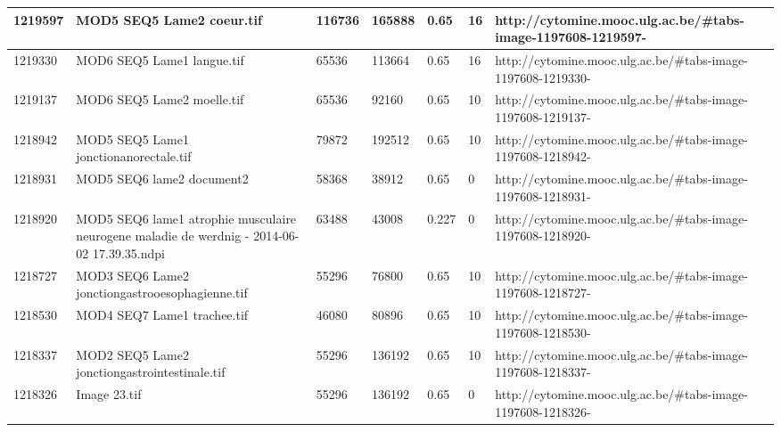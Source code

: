 \documentclass[a4paper,11pt]{report}
\numberwithin{figure}{section} %
\begin{document}
\begin{table}[]
{\begin{tabular}{|l|l|l|l|l|l|l|}
1219597  & MOD5 SEQ5 Lame2 coeur.tif                                                                    & 116736 & 165888 & 0.65                  & 16          & http://cytomine.mooc.ulg.ac.be/\#tabs-image-1197608-1219597-  \\ \hline
1219330  & MOD6 SEQ5 Lame1 langue.tif                                                                   & 65536  & 113664 & 0.65                  & 16          & http://cytomine.mooc.ulg.ac.be/\#tabs-image-1197608-1219330-  \\ \hline
1219137  & MOD6 SEQ5 Lame2 moelle.tif                                                                   & 65536  & 92160  & 0.65                  & 10          & http://cytomine.mooc.ulg.ac.be/\#tabs-image-1197608-1219137-  \\ \hline
1218942  & MOD5 SEQ5 Lame1 jonctionanorectale.tif                                                       & 79872  & 192512 & 0.65                  & 10          & http://cytomine.mooc.ulg.ac.be/\#tabs-image-1197608-1218942-  \\ \hline
1218931  & MOD5 SEQ6 lame2 document2                                                                    & 58368  & 38912  & 0.65                  & 0           & http://cytomine.mooc.ulg.ac.be/\#tabs-image-1197608-1218931-  \\ \hline
1218920  & MOD5 SEQ6 lame1 atrophie musculaire neurogene  maladie de werdnig - 2014-06-02 17.39.35.ndpi & 63488  & 43008  & 0.227                 & 0           & http://cytomine.mooc.ulg.ac.be/\#tabs-image-1197608-1218920-  \\ \hline
1218727  & MOD3 SEQ6 Lame2 jonctiongastrooesophagienne.tif                                              & 55296  & 76800  & 0.65                  & 10          & http://cytomine.mooc.ulg.ac.be/\#tabs-image-1197608-1218727-  \\ \hline
1218530  & MOD4 SEQ7 Lame1 trachee.tif                                                                  & 46080  & 80896  & 0.65                  & 10          & http://cytomine.mooc.ulg.ac.be/\#tabs-image-1197608-1218530-  \\ \hline
1218337  & MOD2 SEQ5 Lame2 jonctiongastrointestinale.tif                                                & 55296  & 136192 & 0.65                  & 10          & http://cytomine.mooc.ulg.ac.be/\#tabs-image-1197608-1218337-  \\ \hline
1218326  & Image 23.tif                                                                                 & 55296  & 136192 & 0.65                  & 0           & http://cytomine.mooc.ulg.ac.be/\#tabs-image-1197608-1218326-  \\ \hline

\end{tabular}}
\end{table}
\end{document}
